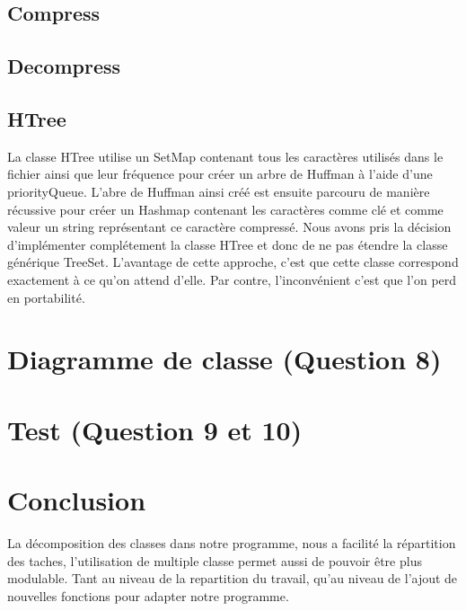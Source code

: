 \documentclass[10pt,a4paper]{article}
\begin{document}
\subsection*{Compress}


\subsection*{Decompress}


\subsection*{HTree}
La classe HTree utilise un SetMap contenant tous les caractères utilisés dans le fichier ainsi que leur fréquence pour créer un arbre de Huffman à l'aide d'une priorityQueue. L'abre de Huffman ainsi créé est ensuite parcouru de manière récussive pour créer un Hashmap contenant les caractères comme clé et comme valeur un string représentant ce caractère compressé.
Nous avons pris la décision d'implémenter complétement la classe HTree et donc de ne pas étendre la classe générique TreeSet. L'avantage de cette approche, c'est que cette classe correspond exactement à ce qu'on attend d'elle. Par contre, l'inconvénient c'est que l'on perd en portabilité.


\section*{Diagramme de classe (Question 8)}

\section*{Test (Question 9 et 10)}

\section*{Conclusion}
La décomposition des classes dans notre programme, nous a facilité la répartition des taches, l'utilisation de multiple classe permet aussi de pouvoir être plus modulable. Tant au niveau de la repartition du travail, qu'au niveau de l'ajout de nouvelles fonctions pour adapter notre programme.\\
\end{document}
